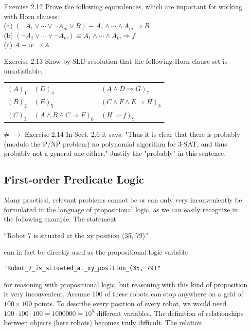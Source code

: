 \documentclass[10pt]{book}
\begin{document}
Exercise 2.12 Prove the following equivalences, which are important for working with Horn clauses:\\
(a) $\left(\neg A_{1} \vee \cdots \vee \neg A_{m} \vee B\right) \equiv A_{1} \wedge \cdots \wedge A_{m} \Rightarrow B$\\
(b) $\left(\neg A_{1} \vee \cdots \vee \neg A_{m}\right) \equiv A_{1} \wedge \cdots \wedge A_{m} \Rightarrow f$\\
(c) $A \equiv w \Rightarrow A$

Exercise 2.13 Show by SLD resolution that the following Horn clause set is unsatisfiable.

\begin{center}
\begin{tabular}{lll}
$(A)_{1}$ & $(D)_{4}$ & $(A \wedge D \Rightarrow G)_{7}$ \\
$(B)_{2}$ & $(E)_{5}$ & $(C \wedge F \wedge E \Rightarrow H)_{8}$ \\
$(C)_{3}$ & $(A \wedge B \wedge C \Rightarrow F)_{6}$ & $(H \Rightarrow f)_{9}$ \\
\end{tabular}
\end{center}

\# $\rightarrow$ Exercise 2.14 In Sect. 2.6 it says: "Thus it is clear that there is probably (modulo the P/NP problem) no polynomial algorithm for 3-SAT, and thus probably not a general one either." Justify the "probably" in this sentence.

\subsection{First-order Predicate Logic}
Many practical, relevant problems cannot be or can only very inconveniently be formulated in the language of propositional logic, as we can easily recognize in the following example. The statement
\begin{displayquote}
``Robot 7 is situated at the xy position (35, 79)''
\end{displayquote}

can in fact be directly used as the propositional logic variable

\begin{verbatim}
"Robot_7_is_situated_at_xy_position_(35, 79)"
\end{verbatim}

for reasoning with propositional logic, but reasoning with this kind of proposition is very inconvenient. Assume 100 of these robots can stop anywhere on a grid of $100 \times 100$ points. To describe every position of every robot, we would need $100 \cdot 100 \cdot 100=1000000=10^{6}$ different variables. The definition of relationships between objects (here robots) becomes truly difficult. The relation
\end{document}
